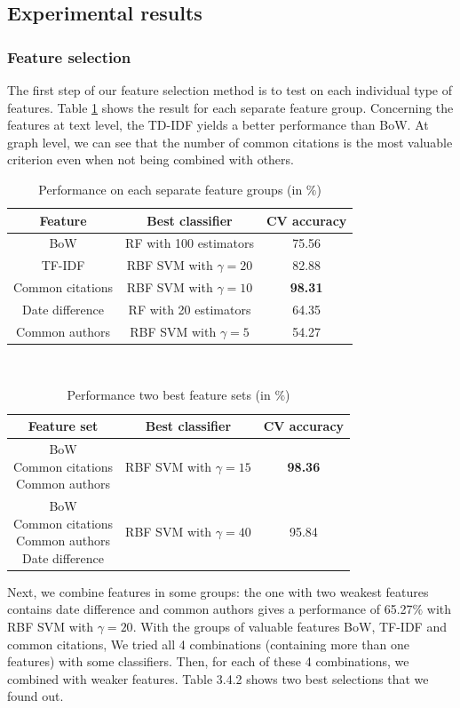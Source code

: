 \documentclass{article}
\begin{document}
\subsection{Experimental results}
\label{sec:result}
\subsubsection{Feature selection}
The first step of our feature selection method is to test on each individual type of features. Table \ref{tab:separate} shows the result for each separate feature group. Concerning the features at text level, the TD-IDF yields a better performance than BoW. At graph level, we can see that the number of common citations is the most valuable criterion even when not being combined with others. 
\begin{table}[t]
	\label{tab:separate}
	\centering
	\caption{Performance on each separate feature groups (in $\%$)}
	\begin{tabular}{|c|c|c|} \hline
		Feature&Best classifier&CV accuracy\\ \hline
		BoW&RF with 100 estimators&75.56\\ \hline
		TF-IDF&RBF SVM with $\gamma=20$&82.88\\ \hline
		Common citations&RBF SVM with $\gamma=10$&\textbf{98.31}\\ \hline
		Date difference&RF with 20 estimators&64.35\\ \hline
		Common authors&RBF SVM with $\gamma=5$&54.27\\ \hline
	\end{tabular}
\end{table}\\
\begin{table}[t]
	\label{tab:combination}
	\centering
	\caption{Performance two best feature sets (in $\%$)}
	\begin{tabular}{|c|c|c|} \hline
		Feature set&Best classifier&CV accuracy\\ \hline
		\pbox{20cm}{BoW\\Common citations\\Common authors}&RBF SVM with $\gamma=15$&\textbf{98.36}\\ \hline
		\pbox{20cm}{BoW\\Common citations\\Common authors\\Date difference}&RBF SVM with $\gamma=40$&95.84\\ \hline
	\end{tabular}
\end{table}
Next, we combine features in some groups: the one with two weakest features contains date difference and common authors gives a performance of 65.27$\%$ with RBF SVM with $\gamma=20$. With the groups of valuable features BoW, TF-IDF and common citations, We tried all 4 combinations (containing more than one features) with some classifiers. Then, for each of these 4 combinations, we combined with weaker features. Table 3.4.2 shows two best selections that we found out.
\end{document}

